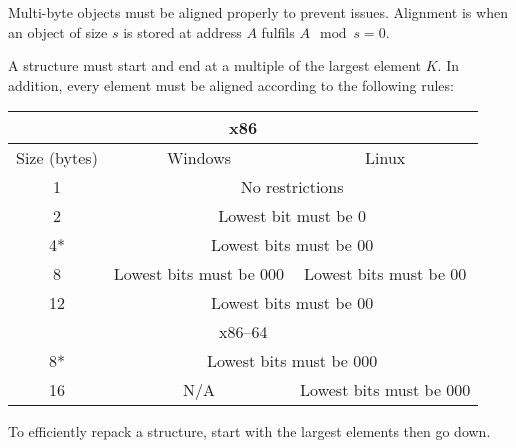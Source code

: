 \documentclass{article}
\theoremstyle{remark}
\begin{document}
Multi-byte objects must be aligned properly to prevent issues. Alignment is when an object of size \(s\) is stored at address \(A\) fulfils \(A \mod s = 0\).

A structure must start and end at a multiple of the largest element \(K\). In addition, every element must be aligned according to the following rules:

\begin{table}[!htbp]
    \centering
    \begin{tabular}{ c c c }
        \toprule
        \multicolumn{3}{c}{x86}                                                              \\
        \midrule
        Size (bytes) & Windows                                     & Linux                   \\
        \midrule
        1            & \multicolumn{2}{c}{No restrictions}                                   \\
        2            & \multicolumn{2}{c}{Lowest bit must be 0}                              \\
        4*           & \multicolumn{2}{c}{Lowest bits must be 00}                            \\
        8            & Lowest bits must be 000                     & Lowest bits must be 00  \\
        12           & \multicolumn{2}{c}{Lowest bits must be 00}                            \\
        \midrule
        \multicolumn{3}{c}{x86--64}                                                          \\
        \midrule
        8*           & \multicolumn{2}{c}{Lowest bits must be 000}                           \\
        16           & N/A                                         & Lowest bits must be 000 \\
        \bottomrule
    \end{tabular}
\end{table}

To efficiently repack a structure, start with the largest elements then go down.
\end{document}
